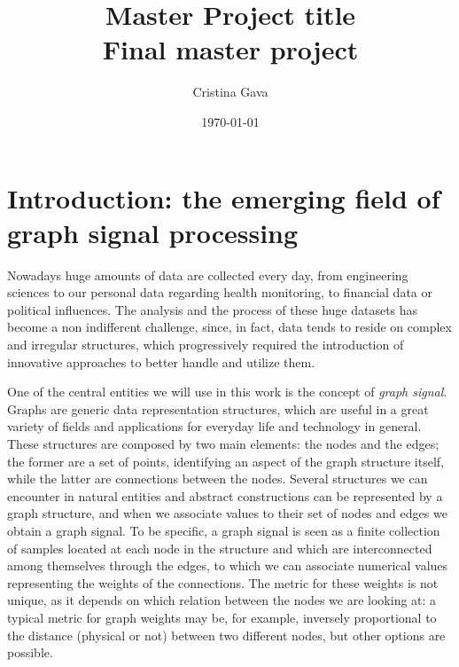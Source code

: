 \documentclass[11pt,a4paper,titlepage]{article}
\title{\blue Master Project title \\
\blueb Final master project}
\author{Cristina Gava}
\date{\today}
\begin{document}
\maketitle

\tableofcontents

\section{Introduction: the emerging field of graph signal processing}
Nowadays huge amounts of data are collected every day, from engineering sciences to our personal data regarding health monitoring, to financial data or political influences. The analysis and the process of these huge datasets has become a non indifferent challenge, since, in fact, data tends to reside on complex and irregular structures, which progressively required the introduction of innovative approaches to better handle and utilize them. \cite{Ortega2017} \cite{Sandry}

One of the central entities we will use in this work is the concept of \textit{graph signal}. Graphs are generic data representation structures, which are useful in a great variety of fields and applications for everyday life and technology in general. These structures are composed by two main elements: the nodes and the edges; the former are a set of points, identifying an aspect of the graph structure itself, while the latter are connections between the nodes. Several structures we can encounter in natural entities and abstract constructions can be represented by a graph structure, and when we associate values to their set of nodes and edges we obtain a graph signal. To be specific, a graph signal is seen as a finite collection of samples located at each node in the structure and which are interconnected among themselves through the edges, to which we can associate numerical values representing the weights of the connections. The metric for these weights is not unique, as it depends on which relation between the nodes we are looking at: a typical metric for graph weights may be, for example, inversely proportional to the distance (physical or not) between two different nodes, but other options are possible.
\end{document}
